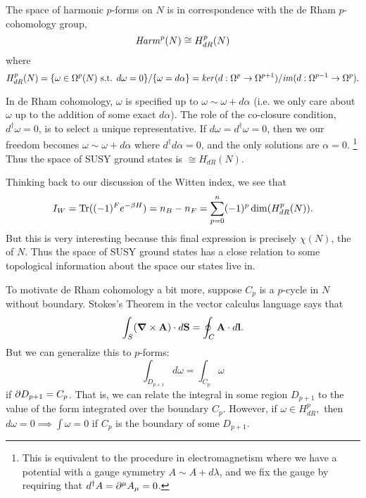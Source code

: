 \begin{thm} The space of harmonic $p$-forms on $N$ is in correspondence with the de Rham $p$-cohomology group,
\begin{equation}
    \text{\emph{Harm}}^p(N) \cong H^p_{dR}(N)
\end{equation}
where
\begin{equation}
    H^p_{dR}(N)=\{\omega \in \Omega^p(N)\text{ s.t. }d\omega=0\}/\{\omega=d\alpha\} = \text{\emph{ker}}(d:\Omega^p\to \Omega^{p+1})/\text{\emph{im}}(d:\Omega^{p-1}\to \Omega^p).
\end{equation}
\end{thm}
In de Rham cohomology, $\omega$ is specified up to $\omega \sim \omega +d\alpha$ (i.e. we only care about $\omega$ up to the addition of some exact $d\alpha$). The role of the co-closure condition, $d^\dagger \omega=0$, is to select a unique representative. If $d\omega = d^\dagger \omega=0$, then we our freedom becomes $\omega \sim \omega +d\alpha$ where $d^\dagger d\alpha =0$, and the only solutions are $\alpha=0$.%
    \footnote{This is equivalent to the procedure in electromagnetism where we have a potential with a gauge symmetry $A\sim A+d\lambda$, and we fix the gauge by requiring that $d^\dagger A = \partial^\mu A_\mu =0$.}
Thus the space of SUSY ground states is $\cong H^\cdot_{dR}(N)$.

Thinking back to our discussion of the Witten index, we see that
\begin{equation}
    I_W = \operatorname{Tr}((-1)^F e^{-\beta H}) = n_B -n_F =\sum_{p=0}^n (-1)^p \dim(H^p_{dR}(N)).
\end{equation}
But this is very interesting because this final expression is precisely $\chi(N)$, the  of $N$. Thus the space of SUSY ground states has a close relation to some topological information about the space our states live in.

To motivate de Rham cohomology a bit more, suppose $C_p$ is a $p$-cycle in $N$ without boundary. Stokes's Theorem in the vector calculus language says that 
\begin{equation*}
    \int_S(\mbox{\boldmath$ \nabla $} \times \boldsymbol{\mathbf{A}}) \cdot d\boldsymbol{\mathbf{S}}=\oint_C \boldsymbol{\mathbf{A}} \cdot d\boldsymbol{\mathbf{l}}.
\end{equation*}
But we can generalize this to $p$-forms:
\begin{equation}
    \int_{D_{p+1}} d\omega = \int_{C_p} \omega
\end{equation}
if $\partial D_{p+1}=C_p$. That is, we can relate the integral in some region $D_{p+1}$ to the value of the form integrated over the boundary $C_p$. However, if $\omega\in H^p_{dR},$ then $d\omega=0 \implies \int \omega=0$ if $C_p$ is the boundary of some $D_{p+1}$.

